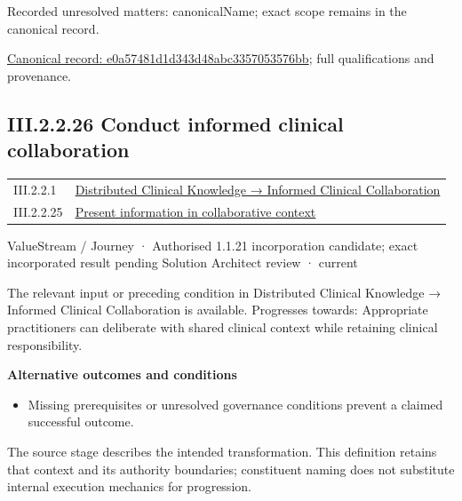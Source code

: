 {\small Recorded unresolved matters: canonicalName; exact scope remains in the canonical record.}\par
{\footnotesize \href{../../../../continuum/strategy/value-stream/e0a57481d1d343d48abc3357053576bb.md}{Canonical record: e0a57481d1d343d48abc3357053576bb}; full qualifications and provenance.}\par
\subsection*{III.2.2.26 Conduct informed clinical collaboration}
\label{navigation:III.2.2.26}

\begin{longtable}{p{.22\linewidth}p{.73\linewidth}}
III.2.2.1 & \hyperref[element:3ba98c0c1170458f8c02fa76694fee67]{Distributed Clinical Knowledge → Informed Clinical Collaboration} \\
III.2.2.25 & \hyperref[element:e0a57481d1d343d48abc3357053576bb]{Present information in collaborative context} \\
\end{longtable}
\label{element:e53b13570f1945829b753d8d7b427fda}
{\small ValueStream / Journey · Authorised 1.1.21 incorporation candidate; exact incorporated result pending Solution Architect review · current}\par

The relevant input or preceding condition in Distributed Clinical Knowledge → Informed Clinical Collaboration is available. Progresses towards: Appropriate practitioners can deliberate with shared clinical context while retaining clinical responsibility.



\par\medskip\textbf{Alternative outcomes and conditions}\par


\begin{itemize}


\item Missing prerequisites or unresolved governance conditions prevent a claimed successful outcome.

\end{itemize}


The source stage describes the intended transformation. This definition retains that context and its authority boundaries; constituent naming does not substitute internal execution mechanics for progression.



